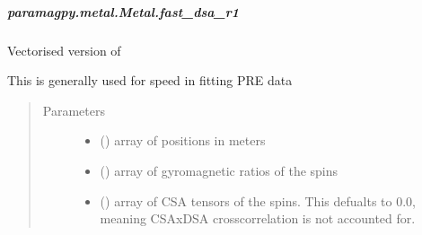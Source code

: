 \documentclass[a4paper,10pt,english]{sphinxmanual}
\begin{document}
\begin{fulllineitems}
\begin{fulllineitems}
\begin{fulllineitems}
\end{fulllineitems}



\subparagraph{paramagpy.metal.Metal.fast\_dsa\_r1}
\label{\detokenize{reference/generated/paramagpy.metal.Metal.fast_dsa_r1:paramagpy-metal-metal-fast-dsa-r1}}\label{\detokenize{reference/generated/paramagpy.metal.Metal.fast_dsa_r1::doc}}

\begin{fulllineitems}
\label{\detokenize{reference/generated/paramagpy.metal.Metal.fast_dsa_r1:paramagpy.metal.Metal.fast_dsa_r1}}
Vectorised version of {\hyperref[\detokenize{reference/generated/paramagpy.metal.Metal.dsa_r1:paramagpy.metal.Metal.dsa_r1}]{}}

This is generally used for speed in fitting PRE data
\begin{quote}\begin{description}
\item[{Parameters}] \leavevmode\begin{itemize}
\item {} 
 (\sphinxstyleliteralemphasis{\sphinxupquote{ (}}\sphinxstyleliteralemphasis{\sphinxupquote{,}}\sphinxstyleliteralemphasis{\sphinxupquote{)}}) \textendash{} array of positions in meters

\item {} 
 (\sphinxstyleliteralemphasis{\sphinxupquote{ (}}\sphinxstyleliteralemphasis{\sphinxupquote{,}}\sphinxstyleliteralemphasis{\sphinxupquote{)}}) \textendash{} array of gyromagnetic ratios of the spins

\item {} 
 (\sphinxstyleliteralemphasis{\sphinxupquote{ (}}\sphinxstyleliteralemphasis{\sphinxupquote{,}}\sphinxstyleliteralemphasis{\sphinxupquote{,}}\sphinxstyleliteralemphasis{\sphinxupquote{) }}\sphinxstyleliteralemphasis{\sphinxupquote{(}}\sphinxstyleliteralemphasis{\sphinxupquote{)}}) \textendash{} array of CSA tensors of the spins.
This defualts to 0.0, meaning CSAxDSA crosscorrelation is
not accounted for.


\end{itemize}
\end{description}
\end{quote}
\end{fulllineitems}
\end{fulllineitems}
\end{fulllineitems}
\end{document}
